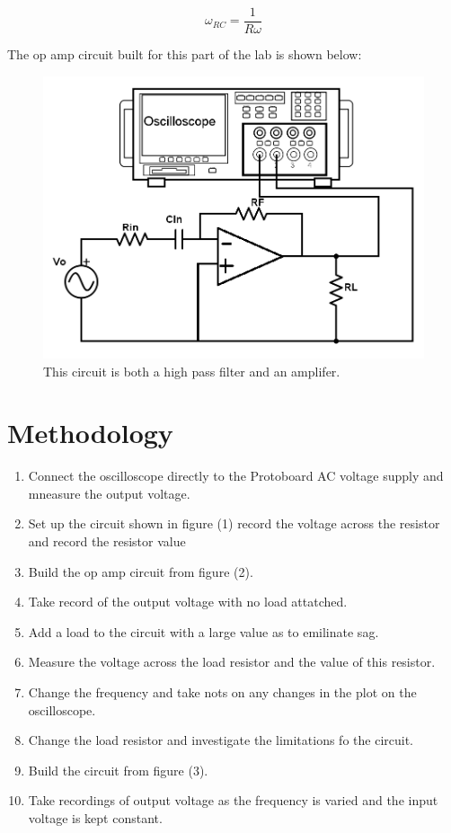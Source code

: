 \documentclass[twocolumn, amsmath]{revtex4}
\begin{document}
\begin{equation}
\omega_{RC} =  \frac{1}{R\omega}
\end{equation}

 The op amp circuit built for this part of the lab is shown below:

\begin{figure}[h]
    \includegraphics[scale=0.4]{highpassamp.png}  
    \caption{This circuit is both a high pass filter and an amplifer.}
\end{figure}


\section{Methodology}

\begin{enumerate}
    \item Connect the oscilloscope directly to the Protoboard AC voltage supply and mneasure the output voltage.
    \item Set up the circuit shown in figure (1) record the voltage across the resistor and record the resistor value
    \item Build the op amp circuit from figure (2).
    \item Take record of the output voltage with no load attatched.
    \item Add a load to the circuit with a large value as to emilinate sag.
    \item Measure the voltage across the load resistor and the value of this resistor.
    \item Change the frequency and take nots on any changes in the plot on the oscilloscope.
    \item Change the load resistor and investigate the limitations fo the circuit.
    \item Build the circuit from figure (3).
    \item Take recordings of output voltage as the frequency is varied and the input voltage is kept constant.
\end{enumerate}
\end{document}
